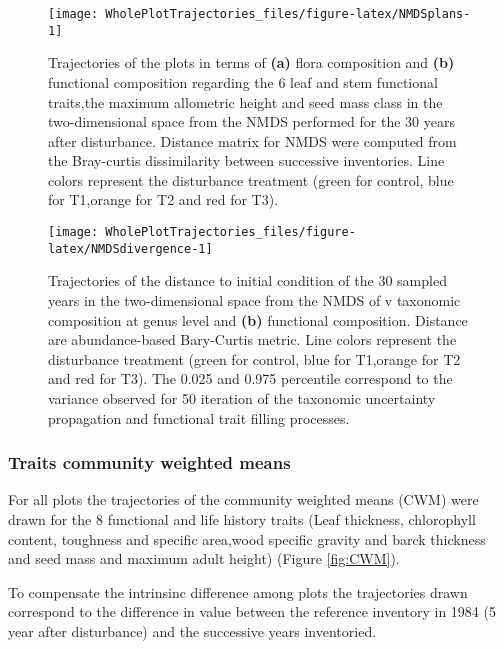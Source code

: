 \documentclass[fleqn,10pt]{ArtEcoFoG} %
\theoremstyle{definition}
\theoremstyle{definition}
\theoremstyle{definition}
\theoremstyle{remark}
\begin{document}
\begin{figure*}

{\centering \texttt{[image: WholePlotTrajectories\_files/figure-latex/NMDSplans-1]} 

}

\caption{Trajectories of the plots in terms of \textbf{(a)} flora composition and \textbf{(b)} functional composition regarding the 6 leaf and stem functional traits,the maximum allometric height and seed mass class in the two-dimensional space from the NMDS performed for the 30 years after disturbance. Distance matrix for NMDS were computed from the Bray-curtis dissimilarity between successive inventories. Line colors represent the disturbance treatment (green for control, blue for T1,orange for T2 and red for T3).}\label{fig:NMDSplans}
\end{figure*}

\begin{figure}

{\centering \texttt{[image: WholePlotTrajectories\_files/figure-latex/NMDSdivergence-1]} 

}

\caption{Trajectories of the distance to initial condition of the 30 sampled years in the two-dimensional space from the NMDS of v taxonomic composition at genus level and \textbf{(b)} functional composition. Distance are abundance-based Bary-Curtis metric. Line colors represent the disturbance treatment (green for control, blue for T1,orange for T2 and red for T3). The 0.025 and 0.975 percentile correspond to the variance observed for 50 iteration of the taxonomic uncertainty propagation and functional trait filling processes. }\label{fig:NMDSdivergence}
\end{figure}

\subsubsection{Traits community weighted
means}\label{traits-community-weighted-means}

For all plots the trajectories of the community weighted means (CWM)
were drawn for the 8 functional and life history traits (Leaf thickness,
chlorophyll content, toughness and specific area,wood specific gravity
and barck thickness and seed mass and maximum adult height) (Figure
\ref{fig:CWM}).

To compensate the intrinsinc difference among plots the trajectories
drawn correspond to the difference in value between the reference
inventory in 1984 (5 year after disturbance) and the successive years
inventoried.
\end{document}
